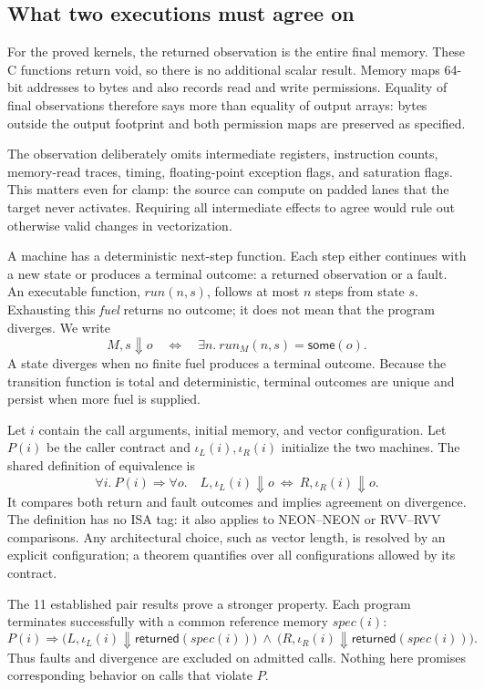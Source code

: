 \documentclass[11pt]{article}
\begin{document}
\subsection{What two executions must agree on}
For the proved kernels, the returned observation is the entire final memory. These C functions return void, so there is no additional scalar result. Memory maps 64-bit addresses to bytes and also records read and write permissions. Equality of final observations therefore says more than equality of output arrays: bytes outside the output footprint and both permission maps are preserved as specified.

The observation deliberately omits intermediate registers, instruction counts, memory-read traces, timing, floating-point exception flags, and saturation flags. This matters even for clamp: the source can compute on padded lanes that the target never activates. Requiring all intermediate effects to agree would rule out otherwise valid changes in vectorization.

A machine has a deterministic next-step function. Each step either continues with a new state or produces a terminal outcome: a returned observation or a fault. An executable function, $\mathit{run}(n,s)$, follows at most $n$ steps from state $s$. Exhausting this \emph{fuel} returns no outcome; it does not mean that the program diverges. We write
\[
 M,s\Downarrow o\quad\Longleftrightarrow\quad
 \exists n.\ \mathit{run}_M(n,s)=\mathsf{some}(o).
\]
A state diverges when no finite fuel produces a terminal outcome. Because the transition function is total and deterministic, terminal outcomes are unique and persist when more fuel is supplied.

Let $i$ contain the call arguments, initial memory, and vector configuration. Let $P(i)$ be the caller contract and $\iota_L(i),\iota_R(i)$ initialize the two machines. The shared definition of equivalence is
\[
 \forall i.\ P(i)\Rightarrow\forall o.\quad
 L,\iota_L(i)\Downarrow o\ \Longleftrightarrow\ R,\iota_R(i)\Downarrow o.
\]
It compares both return and fault outcomes and implies agreement on divergence. The definition has no ISA tag: it also applies to NEON--NEON or RVV--RVV comparisons. Any architectural choice, such as vector length, is resolved by an explicit configuration; a theorem quantifies over all configurations allowed by its contract.

The 11 established pair results prove a stronger property. Each program terminates successfully with a common reference memory $\mathit{spec}(i)$:
\[
 P(i)\Rightarrow
 \bigl(L,\iota_L(i)\Downarrow\mathsf{returned}(\mathit{spec}(i))\bigr)
 \ \land\ 
 \bigl(R,\iota_R(i)\Downarrow\mathsf{returned}(\mathit{spec}(i))\bigr).
\]
Thus faults and divergence are excluded on admitted calls. Nothing here promises corresponding behavior on calls that violate $P$.
\end{document}
